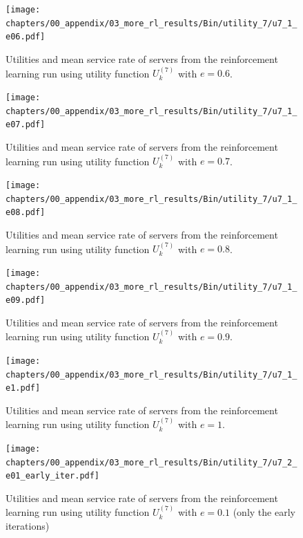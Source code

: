 \begin{figure}[H]
    \texttt{[image: chapters/00\_appendix/03\_more\_rl\_results/Bin/utility\_7/u7\_1\_e06.pdf]}
    \caption{Utilities and mean service rate of servers from the reinforcement
    learning run using utility function \(U_k^{(7)}\) with \(e = 0.6\).}
    \label{fig:RL_utility7_1_e06}
\end{figure}

\begin{figure}[H]
    \texttt{[image: chapters/00\_appendix/03\_more\_rl\_results/Bin/utility\_7/u7\_1\_e07.pdf]}
    \caption{Utilities and mean service rate of servers from the reinforcement
    learning run using utility function \(U_k^{(7)}\) with \(e = 0.7\).}
    \label{fig:RL_utility7_1_e07}
\end{figure}

\begin{figure}[H]
    \texttt{[image: chapters/00\_appendix/03\_more\_rl\_results/Bin/utility\_7/u7\_1\_e08.pdf]}
    \caption{Utilities and mean service rate of servers from the reinforcement
    learning run using utility function \(U_k^{(7)}\) with \(e = 0.8\).}
    \label{fig:RL_utility7_1_e08}
\end{figure}

\begin{figure}[H]
    \texttt{[image: chapters/00\_appendix/03\_more\_rl\_results/Bin/utility\_7/u7\_1\_e09.pdf]}
    \caption{Utilities and mean service rate of servers from the reinforcement
    learning run using utility function \(U_k^{(7)}\) with \(e = 0.9\).}
    \label{fig:RL_utility7_1_e09}
\end{figure}

\begin{figure}[H]
    \texttt{[image: chapters/00\_appendix/03\_more\_rl\_results/Bin/utility\_7/u7\_1\_e1.pdf]}
    \caption{Utilities and mean service rate of servers from the reinforcement
    learning run using utility function \(U_k^{(7)}\) with \(e = 1\).}
    \label{fig:RL_utility7_1_e1}
\end{figure}

\begin{figure}[H]
    \texttt{[image: chapters/00\_appendix/03\_more\_rl\_results/Bin/utility\_7/u7\_2\_e01\_early\_iter.pdf]}
    \caption{Utilities and mean service rate of servers from the reinforcement
    learning run using utility function \(U_k^{(7)}\) with \(e = 0.1\) (only
    the early iterations)}
    \label{fig:RL_utility7_2_e01_early_iter}
\end{figure}

